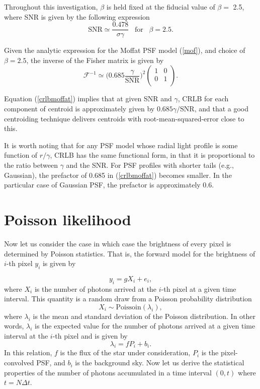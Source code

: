 \documentclass[onecolumn]{aastex61}
\newcommand{\beq}{\begin{equation}}
\newcommand{\eeq}{\end{equation}}
\begin{document}
Throughout this investigation, $\beta$ is held fixed at the fiducial value of $\beta=$ 2.5, where SNR
is given by the following expression
\beq
\text{SNR} \simeq \frac{0.478}{\sigma \gamma}\;\;\; \mathrm{for}\;\;\; \beta = 2.5.
\eeq

Given the analytic expression for the Moffat PSF model (\ref{mof}), and choice of $\beta=2.5$, 
the inverse of the Fisher matrix is given by
\beq
  \mathcal{F}^{-1} \simeq \Big(0.685 \frac{\gamma}{\text{SNR}}\Big)^{2} 
  \begin{pmatrix}
      1 & 0\\
      0 & 1\\
  \end{pmatrix}.
\label{crlbmoffat}
\eeq

Equation (\ref{crlbmoffat}) implies that at given SNR and $\gamma$,
CRLB for each component of centroid is approximately given by $0.685\gamma/\text{SNR}$,
and that a good centroiding technique delivers centroids with
root-mean-squared-error close to this. 

It is worth noting that for any PSF model whose radial light profile is some function of 
$r/\gamma$, CRLB has the same functional form, in that it is proportional to the ratio
between $\gamma$ and the SNR. 
For PSF profiles with shorter tails (e.g., Gaussian), the prefactor of 0.685 in (\ref{crlbmoffat})
becomes smaller. In the particular case of Gaussian PSF, the prefactor is approximately 0.6. 

\section{Poisson likelihood}

Now let us consider the case in which case the brightness of every pixel is determined by Poisson statistics. That is, the forward model for the brightness of $i$-th pixel $y_{i}$ is given by 

\beq
y_{i} = g X_{i} + e_i,
\eeq
where $X_{i}$ is the number of photons arrived at the $i$-th pixel at a given time interval. This quantity is a random draw from a Poisson probability distribution 
\beq
X_{i} \sim \mathrm{Poissoin}(\lambda_{i}), 
\eeq
where $\lambda_{i}$ is the mean and standard deviation of the Poisson distribution. In other words, $\lambda_{i}$ is the expected value for the number of photons arrived at a given time interval at the $i$-th pixel and is given by 
\beq
\lambda_{i} = fP_{i} + b_{i}.
\eeq
In this relation, $f$ is the flux of the star under consideration, $P_{i}$ is the pixel-convolved PSF, and $b_i$ is the background sky.
Now let us derive the statistical properties of the number of photons accumulated in a time interval $(0,t)$ where $t=N\Delta t$.
\end{document}
